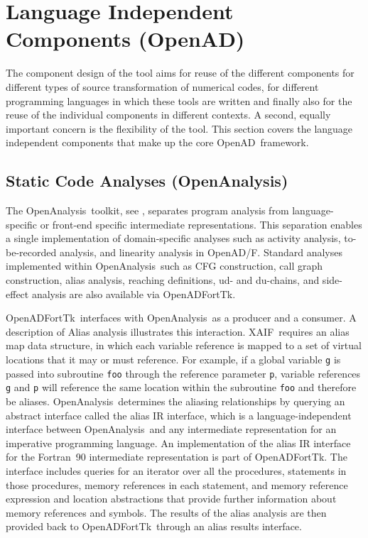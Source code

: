 \documentclass{book}
\newcommand{\OpenADF}{OpenAD/F}
\newcommand{\OpenAD}{OpenAD}
\newcommand{\OpenADFortTk}{OpenADFortTk}
\newcommand{\OpenAnalysis}{OpenAnalysis}
\newcommand{\xaif}{XAIF}
\newcommand{\code}[1]{{\small\tt{#1}}}
\begin{document}
\section{Language Independent Components (\OpenAD)}\label{sec:openadcomponents}

The component design of the tool aims for reuse of the different components 
for different types of source transformation of numerical codes, for 
different programming languages in which these tools are written and finally 
also for the reuse of the individual components in different contexts. 
A second, equally important concern is the flexibility of the tool.  
This section covers the language independent components that make up the core \OpenAD\ framework. 

\subsection{Static Code Analyses (\OpenAnalysis)} \label{ssec:openanalysis}

The \OpenAnalysis\ toolkit, see \cite{oaWeb}, separates program
analysis from language-specific or front-end specific intermediate
representations.  This separation enables a single implementation of
domain-specific analyses such as activity analysis, to-be-recorded
analysis, and linearity analysis in \OpenADF.  Standard analyses
implemented within \OpenAnalysis\ such as CFG construction, call graph
construction, alias analysis, reaching definitions, ud- and du-chains,
and side-effect analysis are also available via
\OpenADFortTk.

\OpenADFortTk\ interfaces with \OpenAnalysis\ as a producer and a
consumer.  A description of Alias analysis illustrates this
interaction.  \xaif\ requires an alias map data structure, in which
each variable reference is mapped to a set of virtual locations that
it may or must reference.  For example, if a global variable \code{g}
is passed into subroutine \code{foo} through the reference parameter
\code{p}, variable references \code{g} and \code{p} will reference the
same location within the subroutine \code{foo} and therefore be aliases.  
\OpenAnalysis\ determines the aliasing relationships by querying an
abstract interface called the alias IR interface, which is a 
language-independent interface between \OpenAnalysis\ and any
intermediate representation for an imperative programming language.  
An implementation of the alias IR interface for the Fortran~90
intermediate representation is part of
\OpenADFortTk.  The interface includes queries for an iterator over
all the procedures, statements in those procedures, memory references
in each statement, and memory reference expression and location
abstractions that provide further information about memory references
and symbols.  The results of the alias analysis are then provided back
to \OpenADFortTk\ through an alias results interface.
\end{document}
